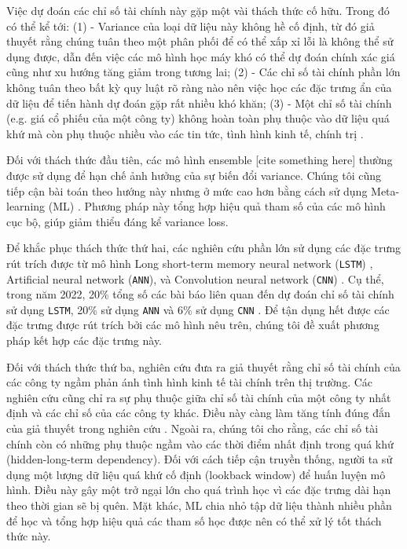 \documentclass[aps,prb,groupedaddress,twocolumn,showpacs,dvipdfmx, superscriptaddress,pdftex]{revtex4-2}
\begin{document}
\vspace{2mm}

Việc dự đoán các chỉ số tài chính này gặp một vài thách thức cố hữu. Trong đó có thể kể tới: (1) - Variance của loại dữ liệu này không hề cố định, từ đó giả thuyết rằng chúng tuân theo một phân phối để có thể xấp xỉ lỗi là không thể sử dụng được, dẫn đến việc các mô hình học máy khó có thể dự đoán chính xác giá cũng như xu hướng tăng giảm trong tương lai; (2) - Các chỉ số tài chính phần lớn không tuân theo bất kỳ quy luật rõ ràng nào nên việc học các đặc trưng ẩn của dữ liệu để tiến hành dự đoán gặp rất nhiều khó khăn; (3) - Một chỉ số tài chính (e.g. giá cổ phiếu của một công ty) không hoàn toàn phụ thuộc vào dữ liệu quá khứ mà còn phụ thuộc nhiều vào các tin tức, tình hình kinh tế, chính trị \cite{li2019multi}.

\vspace{2mm}

Đối với thách thức đầu tiên, các mô hình ensemble [cite something here] thường được sử dụng để hạn chế ảnh hưởng của sự biến đổi variance. Chúng tôi cũng tiếp cận bài toán theo hướng này nhưng ở mức cao hơn bằng cách sử dụng Meta-learning (ML) \cite{finn2017model}. Phương pháp này tổng hợp hiệu quả tham số của các mô hình cục bộ, giúp giảm thiểu đáng kể variance loss.

\vspace{2mm}

Để khắc phục thách thức thứ hai, các nghiên cứu phần lớn sử dụng các đặc trưng rút trích được từ mô hình Long short-term memory neural network (\verb|LSTM|) \cite{hochreiter1997long}, Artificial neural network (\verb|ANN|), và Convolution neural network (\verb|CNN|) \cite{lecun1989handwritten}. Cụ thể, trong năm 2022, 20\% tổng số các bài báo liên quan đến dự đoán chỉ số tài chính sử dụng \verb|LSTM|, 20\% sử dụng \verb|ANN| và 6\% sử dụng \verb|CNN| \cite{ayitey2023forex}. Để tận dụng hết được các đặc trưng được rút trích bởi các mô hình nêu trên, chúng tôi đề xuất phương pháp kết hợp các đặc trưng này.

\vspace{2mm}

Đối với thách thức thứ ba, nghiên cứu \cite{fama1970efficient} đưa ra giả thuyết rằng chỉ số tài chính của các công ty ngầm phản ánh tình hình kinh tế tài chính trên thị trường. Các nghiên cứu \citep{overreactioncontrarian, mech1993portfolio} cũng chỉ ra sự phụ thuộc giữa chỉ số tài chính của một công ty nhất định và các chỉ số của các công ty khác. Điều này càng làm tăng tính đúng đắn của giả thuyết trong nghiên cứu \cite{fama1970efficient}. Ngoài ra, chúng tôi cho rằng, các chỉ số tài chính còn có những phụ thuộc ngầm vào các thời điểm nhất định trong quá khứ (hidden-long-term dependency). Đối với cách tiếp cận truyền thống, người ta sử dụng một lượng dữ liệu quá khứ cố định (lookback window) để huấn luyện mô hình. Điều này gây một trở ngại lớn cho quá trình học vì các đặc trưng dài hạn theo thời gian sẽ bị quên. Mặt khác, ML chia nhỏ tập dữ liệu thành nhiều phần để học và tổng hợp hiệu quả các tham số học được nên có thể xử lý tốt thách thức này.
\end{document}
